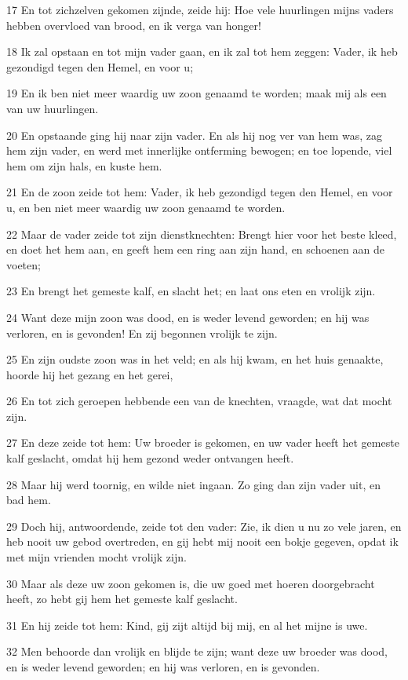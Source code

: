 \par 17 En tot zichzelven gekomen zijnde, zeide hij: Hoe vele huurlingen mijns vaders hebben overvloed van brood, en ik verga van honger!
\par 18 Ik zal opstaan en tot mijn vader gaan, en ik zal tot hem zeggen: Vader, ik heb gezondigd tegen den Hemel, en voor u;
\par 19 En ik ben niet meer waardig uw zoon genaamd te worden; maak mij als een van uw huurlingen.
\par 20 En opstaande ging hij naar zijn vader. En als hij nog ver van hem was, zag hem zijn vader, en werd met innerlijke ontferming bewogen; en toe lopende, viel hem om zijn hals, en kuste hem.
\par 21 En de zoon zeide tot hem: Vader, ik heb gezondigd tegen den Hemel, en voor u, en ben niet meer waardig uw zoon genaamd te worden.
\par 22 Maar de vader zeide tot zijn dienstknechten: Brengt hier voor het beste kleed, en doet het hem aan, en geeft hem een ring aan zijn hand, en schoenen aan de voeten;
\par 23 En brengt het gemeste kalf, en slacht het; en laat ons eten en vrolijk zijn.
\par 24 Want deze mijn zoon was dood, en is weder levend geworden; en hij was verloren, en is gevonden! En zij begonnen vrolijk te zijn.
\par 25 En zijn oudste zoon was in het veld; en als hij kwam, en het huis genaakte, hoorde hij het gezang en het gerei,
\par 26 En tot zich geroepen hebbende een van de knechten, vraagde, wat dat mocht zijn.
\par 27 En deze zeide tot hem: Uw broeder is gekomen, en uw vader heeft het gemeste kalf geslacht, omdat hij hem gezond weder ontvangen heeft.
\par 28 Maar hij werd toornig, en wilde niet ingaan. Zo ging dan zijn vader uit, en bad hem.
\par 29 Doch hij, antwoordende, zeide tot den vader: Zie, ik dien u nu zo vele jaren, en heb nooit uw gebod overtreden, en gij hebt mij nooit een bokje gegeven, opdat ik met mijn vrienden mocht vrolijk zijn.
\par 30 Maar als deze uw zoon gekomen is, die uw goed met hoeren doorgebracht heeft, zo hebt gij hem het gemeste kalf geslacht.
\par 31 En hij zeide tot hem: Kind, gij zijt altijd bij mij, en al het mijne is uwe.
\par 32 Men behoorde dan vrolijk en blijde te zijn; want deze uw broeder was dood, en is weder levend geworden; en hij was verloren, en is gevonden.

